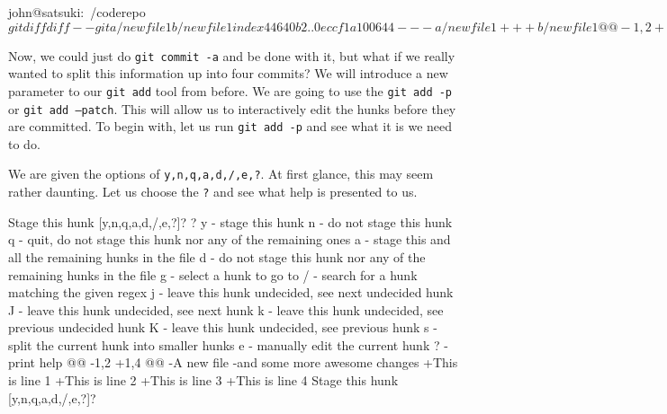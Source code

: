 \begin{code}
john@satsuki:~/coderepo$ git diff
diff --git a/newfile1 b/newfile1
index 44640b2..0eccf1a 100644
--- a/newfile1
+++ b/newfile1
@@ -1,2 +1,4 @@
-A new file
-and some more awesome changes
+This is line 1
+This is line 2
+This is line 3
+This is line 4
diff --git a/newfile2 b/newfile2
index 3545c1d..40efcce 100644
--- a/newfile2
+++ b/newfile2
@@ -1,2 +1,4 @@
 Another new file
 and a new awesome feature
+This is a new line
+This is another new line
john@satsuki:~/coderepo$
\end{code}

Now, we could just do \texttt{git commit -a} and be done with it, but what if we really wanted to split this information up into four commits? We will introduce a new parameter to our \texttt{git add} tool from before.
We are going to use the \texttt{git add -p} or \texttt{git add --patch}.
This will allow us to interactively edit the hunks before they are committed.
To begin with, let us run \texttt{git add -p} and see what it is we need to do.


We are given the options of \texttt{y,n,q,a,d,/,e,?}.
At first glance, this may seem rather daunting.
Let us choose the \texttt{?} and see what help is presented to us.

\begin{code}
Stage this hunk [y,n,q,a,d,/,e,?]? ?
y - stage this hunk
n - do not stage this hunk
q - quit, do not stage this hunk nor any of the remaining ones
a - stage this and all the remaining hunks in the file
d - do not stage this hunk nor any of the remaining hunks in the file
g - select a hunk to go to
/ - search for a hunk matching the given regex
j - leave this hunk undecided, see next undecided hunk
J - leave this hunk undecided, see next hunk
k - leave this hunk undecided, see previous undecided hunk
K - leave this hunk undecided, see previous hunk
s - split the current hunk into smaller hunks
e - manually edit the current hunk
? - print help
@@ -1,2 +1,4 @@
-A new file
-and some more awesome changes
+This is line 1
+This is line 2
+This is line 3
+This is line 4
Stage this hunk [y,n,q,a,d,/,e,?]?
\end{code}

